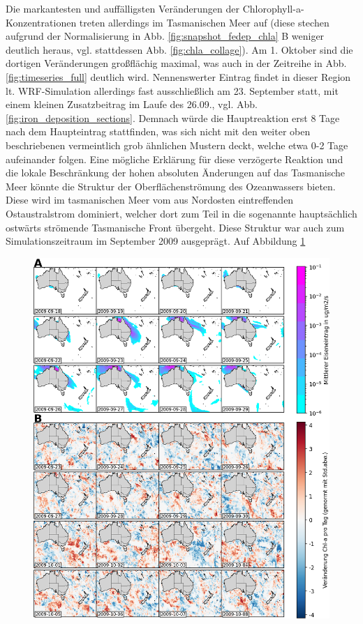 \documentclass[12pt,a4paper,onecolumn]{scrartcl}
\begin{document}
Die markantesten und auffälligsten Veränderungen der Chlorophyll-a-Konzentrationen treten allerdings im Tasmanischen Meer auf (diese stechen aufgrund der Normalisierung in Abb. \ref{fig:snapshot_fedep_chla} B weniger deutlich heraus, vgl. stattdessen Abb. \ref{fig:chla_collage}). Am 1. Oktober sind die dortigen Veränderungen großflächig maximal, was auch in der Zeitreihe in Abb. \ref{fig:timeseries_full} deutlich wird. Nennenswerter Eintrag findet in dieser Region lt. WRF-Simulation allerdings fast ausschließlich am 23. September statt, mit einem kleinen Zusatzbeitrag im Laufe des 26.09., vgl. Abb. \ref{fig:iron_deposition_sections}. Demnach würde die Hauptreaktion erst 8 Tage nach dem Haupteintrag stattfinden, was sich nicht mit den weiter oben beschriebenen vermeintlich grob ähnlichen Mustern deckt, welche etwa 0-2 Tage aufeinander folgen. Eine mögliche Erklärung für diese verzögerte Reaktion und die lokale Beschränkung
der hohen absoluten Änderungen auf das Tasmanische Meer könnte die Struktur der Oberflächenströmung des Ozeanwassers bieten. Diese wird im tasmanischen Meer vom aus Nordosten eintreffenden Ostaustralstrom dominiert, welcher dort zum Teil in die sogenannte hauptsächlich ostwärts strömende Tasmanische Front übergeht. Diese Struktur war auch zum Simulationszeitraum im September 2009 ausgeprägt. Auf Abbildung \ref{fig:tasman_current}
\begin{figure}
\includegraphics[width=\textwidth]{bilder/snapshot_normalized.png}
\caption{} \label{fig:tasman_current}
\end{figure}
\end{document}
